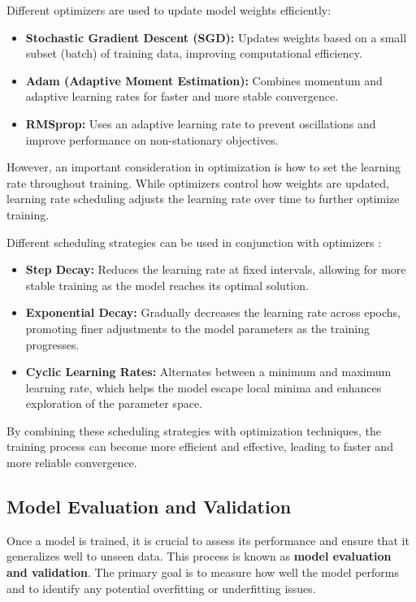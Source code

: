 Different optimizers are used to update model weights efficiently:

\begin{itemize}
    \item \textbf{Stochastic Gradient Descent (SGD):} Updates weights based on a small subset (batch) of training data, improving computational efficiency.
    \item \textbf{Adam (Adaptive Moment Estimation):} Combines momentum and adaptive learning rates for faster and more stable convergence.
    \item \textbf{RMSprop:} Uses an adaptive learning rate to prevent oscillations and improve performance on non-stationary objectives.
\end{itemize}

However, an important consideration in optimization is how to set the learning rate throughout training. While optimizers control how weights are updated, learning rate scheduling adjusts the learning rate over time to further optimize training.

Different scheduling strategies can be used in conjunction with optimizers \parencite{zhao2019learningrate}:

\begin{itemize}
    \item \textbf{Step Decay:} Reduces the learning rate at fixed intervals, allowing for more stable training as the model reaches its optimal solution.
    \item \textbf{Exponential Decay:} Gradually decreases the learning rate across epochs, promoting finer adjustments to the model parameters as the training progresses.
    \item \textbf{Cyclic Learning Rates:} Alternates between a minimum and maximum learning rate, which helps the model escape local minima and enhances exploration of the parameter space.
\end{itemize}

By combining these scheduling strategies with optimization techniques, the training process can become more efficient and effective, leading to faster and more reliable convergence.






\subsection{Model Evaluation and Validation}

Once a model is trained, it is crucial to assess its performance and ensure that it generalizes well to unseen data. This process is known as \textbf{model evaluation and validation}. The primary goal is to measure how well the model performs and to identify any potential overfitting or underfitting issues.

